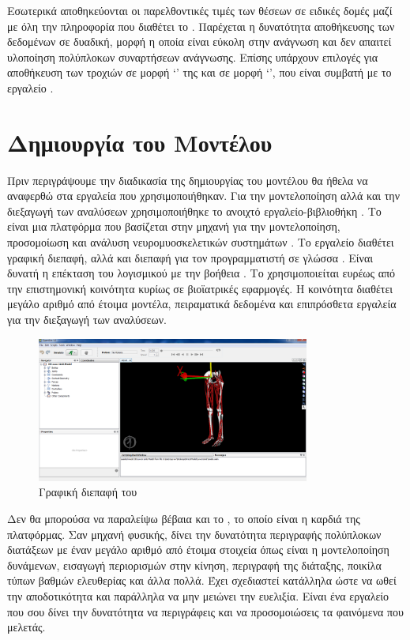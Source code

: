Εσωτερικά αποθηκεύονται οι παρελθοντικές τιμές των θέσεων σε ειδικές δομές μαζί με όλη την πληροφορία που διαθέτει το . Παρέχεται η δυνατότητα αποθήκευσης των δεδομένων σε δυαδική, μορφή η οποία είναι εύκολη στην ανάγνωση και δεν απαιτεί υλοποίηση πολύπλοκων συναρτήσεων ανάγνωσης. Επίσης υπάρχουν επιλογές για αποθήκευση των τροχιών σε μορφή \lq {}\rq\; της  και σε μορφή \lq {}\rq  , που είναι συμβατή με το εργαλείο .

\section{Δημιουργία του Μοντέλου}

Πριν περιγράψουμε την διαδικασία της δημιουργίας του μοντέλου θα ήθελα να αναφερθώ στα εργαλεία που χρησιμοποιήθηκαν. Για την μοντελοποίηση αλλά και την διεξαγωγή των αναλύσεων χρησιμοποιήθηκε το ανοιχτό εργαλείο-βιβλιοθήκη . Το  είναι μια πλατφόρμα που βασίζεται στην μηχανή  για την μοντελοποίηση, προσομοίωση και ανάλυση νευρομυοσκελετικών συστημάτων \cite{delp07}. Το εργαλείο διαθέτει γραφική διεπαφή, αλλά και διεπαφή για τον προγραμματιστή σε γλώσσα . Είναι δυνατή η επέκταση του λογισμικού με την βοήθεια . Το  χρησιμοποιείται ευρέως από την επιστημονική κοινότητα κυρίως σε βιοϊατρικές εφαρμογές. Η κοινότητα διαθέτει μεγάλο αριθμό από έτοιμα μοντέλα, πειραματικά δεδομένα και επιπρόσθετα εργαλεία για την διεξαγωγή των αναλύσεων.

\begin{figure}[H]
    \centering
    \includegraphics[width=0.8\textwidth]{fig/opensim.png}
    \caption{Γραφική διεπαφή του }
    \label{fig:opensim-gui}
\end{figure}

Δεν θα μπορούσα να παραλείψω βέβαια και το , το οποίο είναι η καρδιά της πλατφόρμας. Σαν μηχανή φυσικής, δίνει την δυνατότητα περιγραφής πολύπλοκων διατάξεων με έναν μεγάλο αριθμό από έτοιμα στοιχεία όπως είναι η μοντελοποίηση δυνάμενων, εισαγωγή περιορισμών στην κίνηση, περιγραφή της διάταξης, ποικίλα τύπων βαθμών ελευθερίας και άλλα πολλά. Έχει σχεδιαστεί κατάλληλα ώστε να ωθεί την αποδοτικότητα και παράλληλα να μην μειώνει την ευελιξία. Είναι ένα εργαλείο που σου δίνει την δυνατότητα να περιγράφεις και να προσομοιώσεις τα φαινόμενα που μελετάς.

